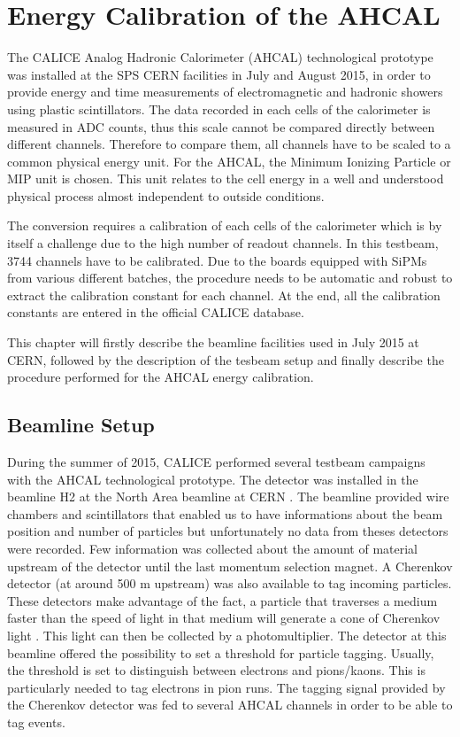 \chapter{Energy Calibration of the AHCAL}
\label{chap:ECalibAHCAL}

The CALICE Analog Hadronic Calorimeter (AHCAL) technological prototype was installed at the SPS CERN facilities in July and August 2015, in order to provide energy and time measurements of electromagnetic and hadronic showers using plastic scintillators. The data recorded in each cells of the calorimeter is measured in ADC counts, thus this scale cannot be compared directly between different channels. Therefore to compare them, all channels have to be scaled to a common physical energy unit. For the AHCAL, the Minimum Ionizing Particle or MIP unit is chosen. This unit relates to the cell energy in a well and understood physical process almost independent to outside conditions.

The conversion requires a calibration of each cells of the calorimeter which is by itself a challenge due to the high number of readout channels. In this testbeam, 3744 channels have to be calibrated. Due to the boards equipped with SiPMs from various different batches, the procedure needs to be automatic and robust to extract the calibration constant for each channel. At the end, all the calibration constants are entered in the official CALICE database.

This chapter will firstly describe the beamline facilities used in July 2015 at CERN, followed by the description of the tesbeam setup and finally describe the procedure performed for the AHCAL energy calibration.

\section{Beamline Setup}
\label{sec:beamline}

During the summer of 2015, CALICE performed several testbeam campaigns with the AHCAL technological prototype. The detector was installed in the beamline H2 at the North Area beamline at CERN \cite{H2Beamline}. The beamline provided wire chambers and scintillators that enabled us to have informations about the beam position and number of particles but unfortunately no data from theses detectors were recorded. Few information was collected about the amount of material upstream of the detector until the last momentum selection magnet. A Cherenkov detector (at around 500 m upstream) was also available to tag incoming particles. These detectors make advantage of the fact, a particle that traverses a medium faster than the speed of light in that medium will generate a cone of Cherenkov light \cite{}. This light can then be collected by a photomultiplier. The detector at this beamline offered the possibility to set a threshold for particle tagging. Usually, the threshold is set to distinguish between electrons and pions/kaons. This is particularly needed to tag electrons in pion runs. The tagging signal provided by the Cherenkov detector was fed to several AHCAL channels in order to be able to tag events.\\

